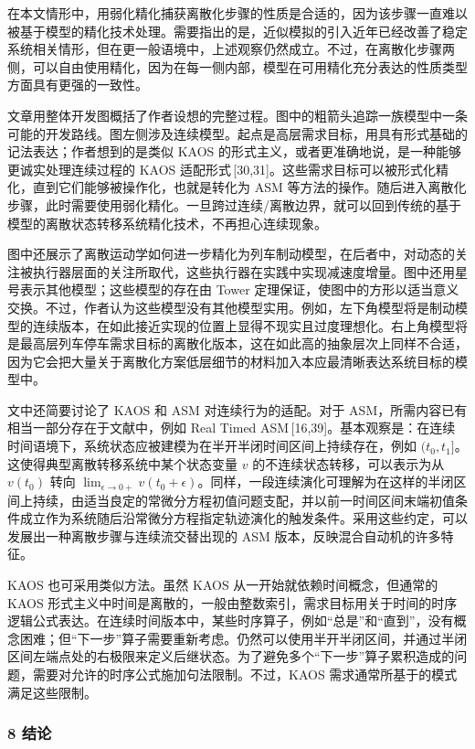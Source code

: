 {\indent 在本文情形中，用弱化精化捕获离散化步骤的性质是合适的，因为该步骤一直难以被基于模型的精化技术处理。需要指出的是，近似模拟的引入近年已经改善了稳定系统相关情形，但在更一般语境中，上述观察仍然成立。不过，在离散化步骤两侧，可以自由使用精化，因为在每一侧内部，模型在可用精化充分表达的性质类型方面具有更强的一致性。

\indent 文章用整体开发图概括了作者设想的完整过程。图中的粗箭头追踪一族模型中一条可能的开发路线。图左侧涉及连续模型。起点是高层需求目标，用具有形式基础的记法表达；作者想到的是类似 KAOS 的形式主义，或者更准确地说，是一种能够更诚实处理连续过程的 KAOS 适配形式\,[30,31]。这些需求目标可以被形式化精化，直到它们能够被操作化，也就是转化为 ASM 等方法的操作。随后进入离散化步骤，此时需要使用弱化精化。一旦跨过连续/离散边界，就可以回到传统的基于模型的离散状态转移系统精化技术，不再担心连续现象。

\indent 图中还展示了离散运动学如何进一步精化为列车制动模型，在后者中，对动态的关注被执行器层面的关注所取代，这些执行器在实践中实现减速度增量。图中还用星号表示其他模型；这些模型的存在由 Tower 定理保证，使图中的方形以适当意义交换。不过，作者认为这些模型没有其他模型实用。例如，左下角模型将是制动模型的连续版本，在如此接近实现的位置上显得不现实且过度理想化。右上角模型将是最高层列车停车需求目标的离散化版本，这在如此高的抽象层次上同样不合适，因为它会把大量关于离散化方案低层细节的材料加入本应最清晰表达系统目标的模型中。

\indent 文中还简要讨论了 KAOS 和 ASM 对连续行为的适配。对于 ASM，所需内容已有相当一部分存在于文献中，例如 Real Timed ASM\,[16,39]。基本观察是：在连续时间语境下，系统状态应被建模为在半开半闭时间区间上持续存在，例如 $(t_0,t_1]$。这使得典型离散转移系统中某个状态变量 $v$ 的不连续状态转移，可以表示为从 $v(t_0)$ 转向 $\lim_{\epsilon\to0+}v(t_0+\epsilon)$。同样，一段连续演化可理解为在这样的半闭区间上持续，由适当良定的常微分方程初值问题支配，并以前一时间区间末端初值条件成立作为系统随后沿常微分方程指定轨迹演化的触发条件。采用这些约定，可以发展出一种离散步骤与连续流交替出现的 ASM 版本，反映混合自动机的许多特征。

\indent KAOS 也可采用类似方法。虽然 KAOS 从一开始就依赖时间概念，但通常的 KAOS 形式主义中时间是离散的，一般由整数索引，需求目标用关于时间的时序逻辑公式表达。在连续时间版本中，某些时序算子，例如“总是”和“直到”，没有概念困难；但“下一步”算子需要重新考虑。仍然可以使用半开半闭区间，并通过半闭区间左端点处的右极限来定义后继状态。为了避免多个“下一步”算子累积造成的问题，需要对允许的时序公式施加句法限制。不过，KAOS 需求通常所基于的模式满足这些限制。

\subsubsection*{8 结论}

}
